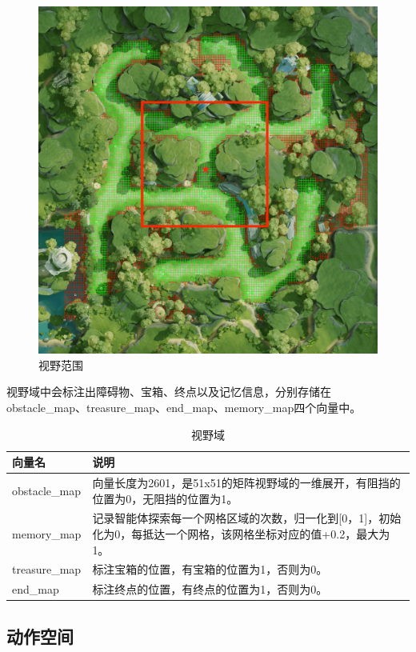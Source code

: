 \begin{figure}[H]
    \centering
    \includegraphics[width=0.8\linewidth]{pic/scope.png}
    \caption{ 视野范围}
    \label{scope}
\end{figure}

 视野域中会标注出障碍物、宝箱、终点以及记忆信息，分别存储在obstacle\_map、treasure\_map、end\_map、memory\_map四个向量中。


\begin{table}[H]
    \begin{tabularx}{1\textwidth}{l  X } %
        \hline %
        \textbf{向量名} & \textbf{说明}  \\
        \hline
        obstacle\_map&向量长度为2601，是51x51的矩阵视野域的一维展开，有阻挡的位置为0，无阻挡的位置为1。\\
        memory\_map&记录智能体探索每一个网格区域的次数，归一化到[0，1]，初始化为0，每抵达一个网格，该网格坐标对应的值+0.2，最大为1。\\
        treasure\_map&标注宝箱的位置，有宝箱的位置为1，否则为0。\\
        end\_map&标注终点的位置，有终点的位置为1，否则为0。\\
        \hline
    \end{tabularx}

    \centering
    \caption{视野域}
    \label{visible-scope}
\end{table}

\subsection{动作空间}

